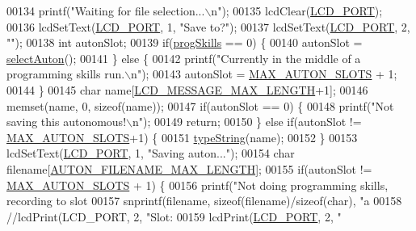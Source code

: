 \begin{DoxyCode}
{{{{{{00134     printf(\textcolor{stringliteral}{"Waiting for file selection...\(\backslash\)n"});
00135     lcdClear(\hyperlink{lcdmsg_8h_abcf42bd88b3c36193f301ca25b033875}{LCD\_PORT});
00136     lcdSetText(\hyperlink{lcdmsg_8h_abcf42bd88b3c36193f301ca25b033875}{LCD\_PORT}, 1, \textcolor{stringliteral}{"Save to?"});
00137     lcdSetText(\hyperlink{lcdmsg_8h_abcf42bd88b3c36193f301ca25b033875}{LCD\_PORT}, 2, \textcolor{stringliteral}{""});
00138     \textcolor{keywordtype}{int} autonSlot;
00139     \textcolor{keywordflow}{if}(\hyperlink{autonrecorder_8c_aa2eda471576bdbaf33835a71da9bc616}{progSkills} == 0) \{
00140         autonSlot = \hyperlink{autonrecorder_8c_a7233586e332461dc25c7cc950a08d429}{selectAuton}();
00141     \} \textcolor{keywordflow}{else} \{
00142         printf(\textcolor{stringliteral}{"Currently in the middle of a programming skills run.\(\backslash\)n"});
00143         autonSlot = \hyperlink{autonrecorder_8h_a5173a11a545cb4020fdd139552dc15c1}{MAX\_AUTON\_SLOTS} + 1;
00144     \}
00145     \textcolor{keywordtype}{char} name[\hyperlink{lcdmsg_8h_abe4c4b70fc6f44ae3680e5b2c68cdd00}{LCD\_MESSAGE\_MAX\_LENGTH}+1];
00146     memset(name, 0, \textcolor{keyword}{sizeof}(name));
00147     \textcolor{keywordflow}{if}(autonSlot == 0) \{
00148         printf(\textcolor{stringliteral}{"Not saving this autonomous!\(\backslash\)n"});
00149         \textcolor{keywordflow}{return};
00150     \} \textcolor{keywordflow}{else} \textcolor{keywordflow}{if}(autonSlot != \hyperlink{autonrecorder_8h_a5173a11a545cb4020fdd139552dc15c1}{MAX\_AUTON\_SLOTS}+1) \{
00151         \hyperlink{lcddiag_8c_a17fe3ffc769a6d02c5226b3bfb79f28f}{typeString}(name);
00152     \}
00153     lcdSetText(\hyperlink{lcdmsg_8h_abcf42bd88b3c36193f301ca25b033875}{LCD\_PORT}, 1, \textcolor{stringliteral}{"Saving auton..."});
00154     \textcolor{keywordtype}{char} filename[\hyperlink{autonrecorder_8h_a9411d1482daa18dd8221c30db7fc6e4e}{AUTON\_FILENAME\_MAX\_LENGTH}];
00155     \textcolor{keywordflow}{if}(autonSlot != \hyperlink{autonrecorder_8h_a5173a11a545cb4020fdd139552dc15c1}{MAX\_AUTON\_SLOTS} + 1) \{
00156         printf(\textcolor{stringliteral}{"Not doing programming skills, recording to slot %
00157         snprintf(filename, \textcolor{keyword}{sizeof}(filename)/\textcolor{keyword}{sizeof}(\textcolor{keywordtype}{char}), \textcolor{stringliteral}{"a%
00158         \textcolor{comment}{//lcdPrint(LCD\_PORT, 2, "Slot: %
00159         lcdPrint(\hyperlink{lcdmsg_8h_abcf42bd88b3c36193f301ca25b033875}{LCD\_PORT}, 2, \textcolor{stringliteral}{"%
}}}}}}}}}}
\end{DoxyCode}
